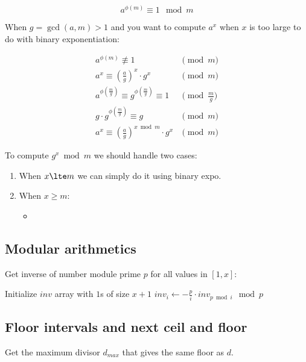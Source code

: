 \documentclass[14pt]{extarticle}
\begin{document}
\[
  a^{\phi(m)} \equiv 1 \mod m
\]

When $g = \gcd(a, m) > 1$ and you want to compute $a^x$ when $x$ is too large to do with binary exponentiation:

\begin{align*}
    a^{\phi(m)} \not\equiv 1 &\pmod{m} \\
    a^{x} \equiv \left(\frac{a}{g}\right)^x \cdot g^x &\pmod{m} \\
    a^{\phi\left(\frac m g\right)} \equiv g^{\phi\left(\frac m g\right)} \equiv 1 &\pmod{\frac{m}{g}} \\
    g \cdot g^{\phi\left(\frac m g\right)} \equiv g &\pmod{m} \\
    a^{x} \equiv \left(\frac{a}{g}\right)^{x \bmod m} \cdot g^x &\pmod{m}
\end{align*}

To compute $g^x \bmod m$ we should handle two cases:

\begin{enumerate}
  \item When $x \lte m$ we can simply do it using binary expo.
  \item When $x \ge m$:
    \begin{itemize}
      \item 
    \end{itemize}
\end{enumerate}


\subsection{Modular arithmetics}

Get inverse of number module prime $p$ for all values in $[1, x]$:

\begin{algorithm}
    \begin{algorithmic}[1]
        \State Initialize $inv$ array with $1$s of size $x + 1$
            \State $inv_i \gets - \frac p i \cdot inv_{p \bmod i} \mod p$
        \EndFor
    \end{algorithmic}
\end{algorithm}

\subsection{Floor intervals and next ceil and floor}

Get the maximum divisor $d_{max}$ that gives the same floor as $d$.
\end{document}
